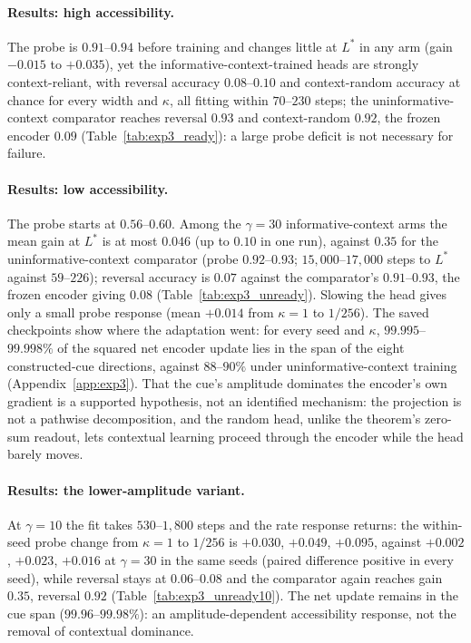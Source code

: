 \paragraph{Results: high accessibility.}
The probe is $0.91$--$0.94$ before training and changes little at
$L^\ast$ in any arm (gain $-0.015$ to $+0.035$), yet the
informative-context-trained heads are strongly context-reliant, with
reversal accuracy $0.08$--$0.10$ and context-random accuracy at chance
for every width and $\kappa$, all fitting within $70$--$230$ steps; the
uninformative-context comparator
reaches reversal $0.93$ and context-random $0.92$, the frozen encoder $0.09$
(Table~\ref{tab:exp3_ready}): a large probe deficit is not necessary for
failure.

\paragraph{Results: low accessibility.}
The probe starts at $0.56$--$0.60$. Among the $\gamma=30$
informative-context arms the mean gain at $L^\ast$ is at most $0.046$
(up to $0.10$ in one run), against $0.35$
for the uninformative-context comparator (probe $0.92$--$0.93$;
$15{,}000$--$17{,}000$ steps to $L^\ast$ against $59$--$226$); reversal
accuracy is $0.07$ against the comparator's $0.91$--$0.93$, the frozen
encoder giving $0.08$ (Table~\ref{tab:exp3_unready}). Slowing the head
gives only a small probe response (mean $+0.014$ from $\kappa=1$ to
$1/256$). The saved checkpoints show where the adaptation went: for every
seed and $\kappa$, $99.995$--$99.998\%$ of the squared net encoder update
lies in the span of the eight constructed-cue directions, against
$88$--$90\%$ under uninformative-context training
(Appendix~\ref{app:exp3}). That the cue's amplitude dominates the
encoder's own gradient is a supported hypothesis, not an identified
mechanism: the projection is not a pathwise decomposition, and the random
head, unlike the theorem's zero-sum readout, lets contextual learning
proceed through the encoder while the head barely moves.

\paragraph{Results: the lower-amplitude variant.}
At $\gamma=10$ the fit takes $530$--$1{,}800$ steps and the rate response
returns: the within-seed probe change from $\kappa=1$ to $1/256$ is
$+0.030$, $+0.049$, $+0.095$, against $+0.002$, $+0.023$, $+0.016$ at
$\gamma=30$ in the same seeds (paired difference positive in every seed),
while reversal stays at $0.06$--$0.08$ and the comparator again reaches
gain $0.35$, reversal $0.92$ (Table~\ref{tab:exp3_unready10}). The net update remains in the cue span
($99.96$--$99.98\%$): an amplitude-dependent accessibility response, not
the removal of contextual dominance.

